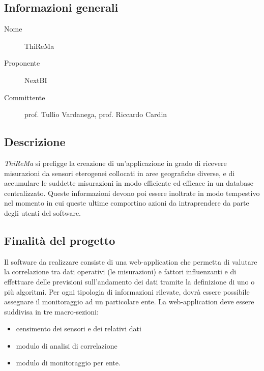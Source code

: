 \documentclass[../studio-di-fattibilita.tex]{subfiles}
\begin{document}
  \subsection{Informazioni generali}%
  \label{subsec:informazioni_generali}
  \begin{description}
    \item[Nome] ThiReMa
    \item[Proponente] NextBI
    \item[Committente] prof. Tullio Vardanega, prof. Riccardo Cardin
  \end{description}

  \subsection{Descrizione}%
  \label{subsec:descrizione}
  \textit{ThiReMa} si prefigge la creazione di un'applicazione in grado di ricevere misurazioni da sensori eterogenei collocati in aree geografiche diverse, e di accumulare le suddette misurazioni in modo efficiente ed efficace in un database centralizzato. Queste informazioni devono poi essere inoltrate in modo tempestivo nel momento in cui queste ultime comportino azioni da intraprendere da parte degli utenti del software.

  \subsection{Finalità del progetto}%
  \label{subsec:finalita_del_progetto}
  Il software da realizzare consiste di una web-application che permetta di valutare la correlazione tra dati operativi (le misurazioni) e fattori influenzanti e di effettuare delle previsioni sull'andamento dei dati tramite la definizione di uno o più algoritmi.
  Per ogni tipologia di informazioni rilevate, dovrà essere possibile assegnare il monitoraggio ad un particolare ente.
  La web-application deve essere suddivisa in tre macro-sezioni:
  \begin{itemize}
    \item censimento dei sensori e dei relativi dati
    \item modulo di analisi di correlazione
    \item modulo di monitoraggio per ente.
  \end{itemize}
\end{document}
